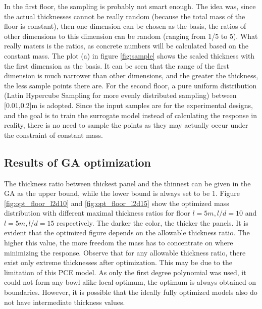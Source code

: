 In the first floor, the sampling is probably not smart enough. The idea was, since the actual thicknesses cannot be really random (because the total mass of the floor is constant), then one dimension can be chosen as the basis, the ratios of other dimensions to this dimension can be random (ranging from 1/5 to 5). What really maters is the ratios, as concrete numbers will be calculated based on the constant mass. The plot (a) in figure \ref{fig:sample} shows the scaled thickness with the first dimension as the basis. It can be seen that the range of the first dimension is much narrower than other dimensions, and the greater the thickness, the less sample points there are. For the second floor, a pure uniform distribution (Latin Hypercube Sampling for more evenly distributed sampling) between [0.01,0.2]m is adopted. Since the input samples are for the experimental designs, and the goal is to train the surrogate model instead of calculating the response in reality, there is no need to sample the points as they may actually occur under the constraint of constant mass.

\subsection{Results of GA optimization}
The thickness ratio between thickest panel and the thinnest can be given in the GA as the upper bound, while the lower bound is always set to be 1. Figure \ref{fig:opt_floor_l2d10} and \ref{fig:opt_floor_l2d15} show the optimized mass distribution with different maximal thickness ratios for floor $l=5m,l/d=10$ and $l=5m,l/d=15$ respectively. The darker the color, the thicker the panels. It is evident that the optimized figure depends on the allowable thickness ratio. The higher this value, the more freedom the mass has to concentrate on where minimizing the response. Observe that for any allowable thickness ratio, there exist only extreme thicknesses after optimization. This may be due to the limitation of this PCE model. As only the first degree polynomial was used, it could not form any bowl alike local optimum, the optimum is always obtained on boundaries. However, it is possible that the ideally fully optimized models also do not have intermediate thickness values. 

